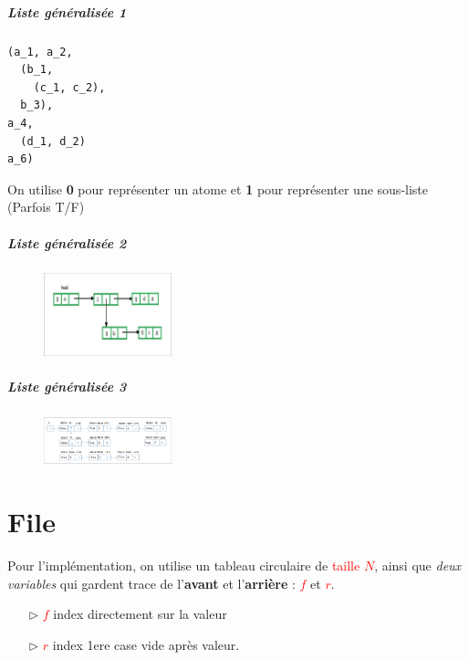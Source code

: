 \documentclass{report}
\begin{document}
\begin{multicols*}{3}
  \paragraph{Liste généralisée 1}
  \begin{lstlisting}
(a_1, a_2, 
  (b_1, 
    (c_1, c_2), 
  b_3), 
a_4, 
  (d_1, d_2) 
a_6) 
  \end{lstlisting}

  \begin{note}{}{}
      On utilise \textbf{0} pour représenter un 
      atome et \textbf{1} pour représenter une 
      sous-liste (Parfois T/F)
  \end{note}

  \paragraph{Liste généralisée 2}
  \begin{figure}[H]
    \begin{center}
      \includegraphics[width=0.33\textwidth]{ListeGen2.png}
    \end{center}
  \end{figure}

  \paragraph{Liste généralisée 3}

  \begin{figure}[H]
    \begin{center}
      \includegraphics[width=0.33\textwidth]{Listegen.png}
    \end{center}
  \end{figure}


  \chapter{File}
  Pour l'implémentation, on utilise un tableau circulaire de 
  \textcolor{red}{taille $N$}, ainsi que 
  \textit{deux variables} qui gardent trace de 
  l'\textbf{avant} et l'\textbf{arrière} : 
  \textcolor{red}{$f$} et \textcolor{red}{$r$}.       
  \begin{itemize}
    \item [$\rhd$ ] \textcolor{red}{$f$} 
      index directement sur la valeur  
    \item [$\rhd$ ] \textcolor{red}{$r$} 
      index 1ere case vide après valeur. 
  \end{itemize}



\end{multicols*}
\end{document}
